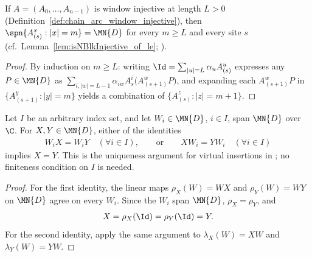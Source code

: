 \begin{lemma}%
    \label{lem:isWindowInjective_arc_span}
    \leanok
    If $A=(A_0,\ldots,A_{n-1})$ is window injective at length $L>0$
    (Definition~\ref{def:chain_arc_window_injective}), then
    $\spn\{A_{(s)}^x:|x|=m\}=\MN{D}$ for every $m \ge L$ and every site $s$
    (cf.\ Lemma~\ref{lem:isNBlkInjective_of_le};
    \cite[Section~``Normal MPS: alternative proof'']{Molnar2018NormalPEPS}).
\end{lemma}
\begin{proof}\leanok
    By induction on $m\ge L$: writing $\Id=\sum_{|u|=L}\alpha_u A_{(s)}^u$
    expresses any $P\in\MN{D}$ as
    $\sum_{i,|w|=L-1}\alpha_{iw} A_s^i\bigl(A_{(s+1)}^w P\bigr)$, and expanding
    each $A_{(s+1)}^w P$ in $\{A_{(s+1)}^y:|y|=m\}$ yields a combination of
    $\{A_{(s)}^z:|z|=m+1\}$.
\end{proof}

\begin{lemma}
    \label{lem:chain_spanning_matrix_cancellation}
    \leanok
    Let $I$ be an arbitrary index set, and let
    $W_i\in\MN{D}$, $i\in I$, span $\MN{D}$ over $\C$.
    For $X,Y\in\MN{D}$, either of the identities
    \begin{align}
        W_iX=W_iY\quad(\forall i\in I),
        \qquad\text{or}\qquad
        XW_i=YW_i\quad(\forall i\in I)
        \label{eq:chain_spanning_matrix_cancellation}
    \end{align}
    implies $X=Y$. This is the uniqueness argument for virtual insertions
    in \cite[Lemma~5]{Molnar2018NormalPEPS}; no finiteness condition on
    $I$ is needed.
\end{lemma}
\begin{proof}\leanok
    For the first identity, the linear maps $\rho_X(W)=WX$ and $\rho_Y(W)=WY$
    on $\MN{D}$ agree on every $W_i$. Since the $W_i$ span $\MN{D}$,
    $\rho_X=\rho_Y$, and
    \begin{align}
        X=\rho_X(\Id)=\rho_Y(\Id)=Y.
    \end{align}
    For the second identity, apply the same argument to
    $\lambda_X(W)=XW$ and $\lambda_Y(W)=YW$.
\end{proof}


